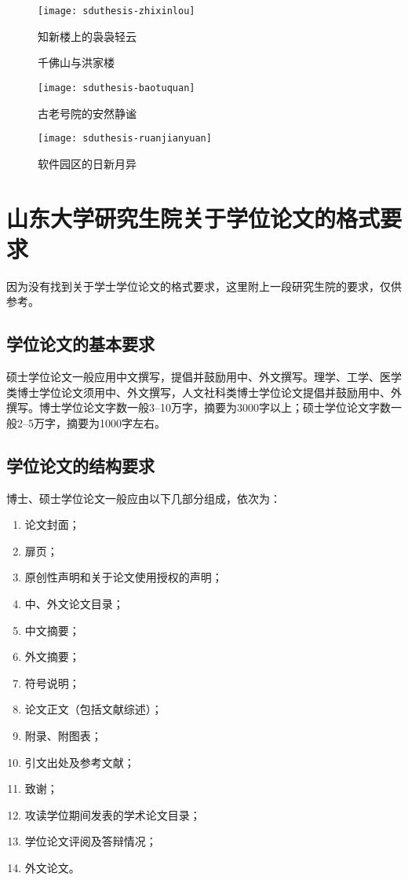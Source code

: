 \documentclass[openany]{sduthesis} %
\begin{document}
\begin{figure}[!htb]
\centering
\texttt{[image: sduthesis-zhixinlou]}
\caption{知新楼上的袅袅轻云}\label{fig:zhixinlou}
\end{figure}

\begin{figure}[!htb]
\centering
{}\quad
{}\quad
\caption{千佛山与洪家楼}
\end{figure}

\begin{figure}[!htb]
\centering
\begin{minipage}{0.5\linewidth}
\centering
\texttt{[image: sduthesis-baotuquan]}
\caption{古老号院的安然静谧}\label{fig:baotuquan}
\end{minipage}%
\begin{minipage}{0.5\linewidth}
\centering
\texttt{[image: sduthesis-ruanjianyuan]}
\caption{软件园区的日新月异}\label{fig:ruanjianyuan}
\end{minipage}
\end{figure}
\appendix
\chapter{山东大学研究生院关于学位论文的格式要求}
因为没有找到关于学士学位论文的格式要求，这里附上一段研究生院的要求，仅供参考。
\section{学位论文的基本要求}
硕士学位论文一般应用中文撰写，提倡并鼓励用中、外文撰写。理学、工学、医学类博士学位论文须用中、外文撰写，人文社科类博士学位论文提倡并鼓励用中、外撰写。博士学位论文字数一般3--10万字，摘要为3000字以上；硕士学位论文字数一般2--5万字，摘要为1000字左右。
\section{学位论文的结构要求}
博士、硕士学位论文一般应由以下几部分组成，依次为：
\begin{enumerate}
\item 论文封面；\item 扉页；\item 原创性声明和关于论文使用授权的声明；\item 中、外文论文目录；\item 中文摘要；\item 外文摘要；\item 符号说明；\item 论文正文（包括文献综述）；\item 附录、附图表；\item 引文出处及参考文献；\item 致谢；\item 攻读学位期间发表的学术论文目录；\item 学位论文评阅及答辩情况；\item 外文论文。
\end{enumerate}
\end{document}
